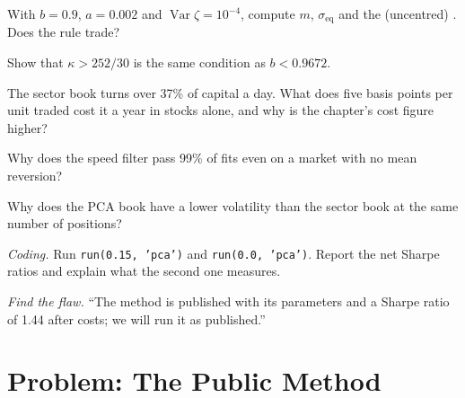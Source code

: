 \begin{exercise}[$\star$]\label{exo:s1:residual-and-principal-component-stat-arb:2}
With $b = 0.9$, $a = 0.002$ and $\operatorname{Var}\zeta = 10^{-4}$, compute $m$, $\sigma_{\mathrm{eq}}$ and the (uncentred) . Does the rule trade?
\end{exercise}

\begin{exercise}[$\star$]\label{exo:s1:residual-and-principal-component-stat-arb:3}
Show that $\kappa > 252/30$ is the same condition as $b < 0.9672$.
\end{exercise}

\begin{exercise}[$\star\star$]\label{exo:s1:residual-and-principal-component-stat-arb:4}
The sector book turns over 37\% of capital a day. What does five basis points per unit traded cost it a year in stocks alone, and why is the chapter's cost
figure higher?
\end{exercise}

\begin{exercise}[$\star\star$]\label{exo:s1:residual-and-principal-component-stat-arb:5}
Why does the speed filter pass 99\% of fits even on a market with no mean reversion?
\end{exercise}

\begin{exercise}[$\star\star$]\label{exo:s1:residual-and-principal-component-stat-arb:6}
Why does the PCA book have a lower volatility than the sector book at the same number of positions?
\end{exercise}

\begin{exercise}[$\star\star\star$]\label{exo:s1:residual-and-principal-component-stat-arb:7}
\emph{Coding.} Run \texttt{run(0.15, 'pca')} and \texttt{run(0.0, 'pca')}. Report the net Sharpe ratios and explain what the second one measures.
\end{exercise}

\begin{exercise}[$\star\star\star$]\label{exo:s1:residual-and-principal-component-stat-arb:8}
\emph{Find the flaw.} ``The method is published with its parameters and a Sharpe ratio of 1.44 after costs; we will run it as published.''
\end{exercise}

\section{Problem: The Public Method}

